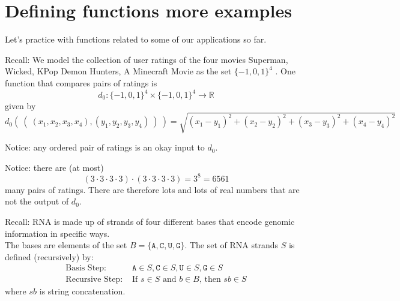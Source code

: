 \documentclass[12pt, oneside]{article}
\newcommand{\A}[0]{\texttt{A}}
\newcommand{\C}[0]{\texttt{C}}
\newcommand{\G}[0]{\texttt{G}}
\newcommand{\U}[0]{\texttt{U}}
\newcommand{\cmark}{\ding{51}}
\newcommand{\xmark}{\ding{55}}
\begin{document}
\vfill
\vfill

\newpage \vfill
\section*{Defining functions more examples}


Let's practice with functions related to some of our applications so far.

Recall: We model the collection of user ratings of the four movies Superman, Wicked, KPop Demon Hunters, A Minecraft Movie as the set
$\{-1,0,1\}^4$ . One function that compares pairs of ratings is
$$d_0: \{-1,0,1\}^4 \times \{-1,0,1\}^4 \to \mathbb{R}$$
given by
\[
d_0 (~(~ (x_1, x_2, x_3, x_4), (y_1, y_2, y_3, y_4) ~) ~) = \sqrt{ (x_1 - y_1)^2 + (x_2 - y_2)^2 + (x_3 -y_3)^2 + (x_4 -y_4)^2}
\]

Notice: any ordered pair of ratings is an okay input to $d_0$.

Notice: there are (at most) 
\[
(3 \cdot 3 \cdot 3 \cdot 3)\cdot (3 \cdot 3 \cdot 3 \cdot 3) = 3^8 = 6561
\]
many pairs of ratings. There are therefore lots and lots of real numbers that are not the output of $d_0$.

\vfill

Recall: RNA is made up of strands of four different bases that encode genomic information
in specific ways.\\
The bases are elements of the set 
$B  = \{\A, \C, \U, \G \}$. The set of RNA strands $S$ is defined (recursively) by:
\[
\begin{array}{ll}
\textrm{Basis Step: } & \A \in S, \C \in S, \U \in S, \G \in S \\
\textrm{Recursive Step: } & \textrm{If } s \in S\textrm{ and }b \in B \textrm{, then }sb \in S
\end{array}
\]
where $sb$ is string concatenation.

\vfill
\end{document}
